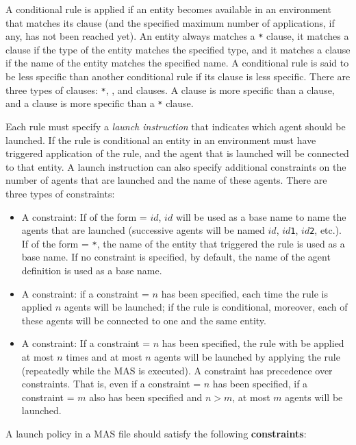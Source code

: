 \documentclass{article}
\begin{document}
A conditional rule is applied if an entity becomes available in an environment that matches its \when clause (and the specified maximum number of applications, if any, has not been reached yet). An entity always matches a \texttt{*} clause, it matches a \type clause if the type of the entity matches the specified type, and it matches a \name clause if the name of the entity matches the specified name. A conditional rule is said to be less specific than another conditional rule if its \when clause is less specific. There are three types of \when clauses: \texttt{*}, \type, and \name clauses. A \name clause is more specific than a \type clause, and a \type clause is more specific than a \texttt{*} clause.

Each rule must specify a \textit{launch instruction} that indicates which agent should be launched. If the rule is conditional an entity in an environment must have triggered application of the rule, and the agent that is launched will be connected to that entity. A launch instruction can also specify additional constraints on the number of agents that are launched and the name of these agents. There are three types of constraints:
\begin{itemize}
\item A \name constraint: If of the form \name = $id$, $id$ will be used as a base name to name the agents that are launched (successive agents will be named $id$, $id$\texttt{1}, $id$\texttt{2}, etc.). If of the form \name = \texttt{*}, the name of the entity that triggered the rule is used as a base name. If no \name constraint is specified, by default, the name of the agent definition is used as a base name.
\item A \nr constraint: if a constraint \nr = $n$ has been specified, each time the rule is applied $n$ agents will be launched; if the rule is conditional, moreover, each of these agents will be connected to one and the same entity.
\item A \maxnr constraint: If a constraint \maxnr = $n$ has been specified, the rule with be applied at most $n$ times and at most $n$ agents will be launched by applying the rule (repeatedly while the MAS is executed). A \maxnr constraint has precedence over \nr constraints. That is, even if a constraint \nr = $n$ has been specified, if a constraint \maxnr = $m$ also has been specified and $n>m$, at most $m$ agents will be launched.
\end{itemize}
\noindent
A launch policy in a MAS file should satisfy the following \textbf{constraints}:
\end{document}

